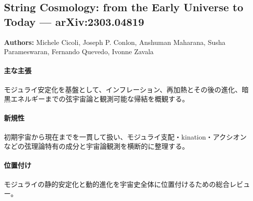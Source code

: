 \subsection{String Cosmology: from the Early Universe to Today --- arXiv:2303.04819}

\textbf{Authors:} Michele Cicoli, Joseph P. Conlon, Anshuman Maharana, Susha Parameswaran, Fernando Quevedo, Ivonne Zavala

\paragraph{主な主張}
モジュライ安定化を基盤として、インフレーション、再加熱とその後の進化、暗黒エネルギーまでの弦宇宙論と観測可能な帰結を概観する\cite{Cicoli:2023opf}。

\paragraph{新規性}
初期宇宙から現在までを一貫して扱い、モジュライ支配・kination・アクシオンなどの弦理論特有の成分と宇宙論観測を横断的に整理する。

\paragraph{位置付け}
モジュライの静的安定化と動的進化を宇宙史全体に位置付けるための総合レビュー。
